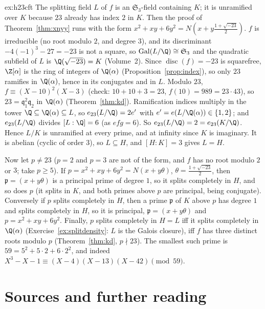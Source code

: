 \begin{solution}{ex:h23cft}
\idea The splitting field $L$ of $f$ is an $\mathfrak S_3$-field containing $K$; it is unramified over $K$ because $23$ already has index $2$ in $K$. Then the proof of
Theorem~\ref{thm:xnyy} runs with the form $x^2+xy+6y^2=N(x+y\frac{1+\sqrt{-23}}2)$.
\writeup $f$ is irreducible (no root modulo $2$, and degree $3$), and its discriminant $-4(-1)^3-27=-23$ is not a square, so $\operatorname{Gal}(L/\Q)\cong\mathfrak S_3$ and the
quadratic subfield of $L$ is $\Q(\sqrt{-23})=K$ (Volume~2). Since $\operatorname{disc}(f)=-23$ is squarefree, $\Z[\alpha]$ is the ring of integers of $\Q(\alpha)$ (Proposition~\ref{prop:index}),
so only $23$ ramifies in $\Q(\alpha)$, hence in its conjugates and in $L$. Modulo $23$, $f\equiv(X-10)^2(X-3)$ (check: $10+10+3=23$, $f(10)=989=23\cdot43$), so
$23=\mathfrak q_1^2\mathfrak q_2$ in $\Q(\alpha)$ (Theorem~\ref{thm:kd}). Ramification indices multiply in the tower $\Q\subseteq\Q(\alpha)\subseteq L$, so
$e_{23}(L/\Q)=2e'$ with $e'=e(L/\Q(\alpha))\in\{1,2\}$; and $e_{23}(L/\Q)$ divides $[L:\Q]=6$ (as $efg=6$). So $e_{23}(L/\Q)=2=e_{23}(K/\Q)$.
Hence $L/K$ is unramified at every prime, and at infinity since $K$ is imaginary. It is abelian (cyclic of order $3$), so $L\subseteq H$, and $[H:K]=3$ gives $L=H$.

Now let $p\ne23$ ($p=2$ and $p=3$ are not of the form, and $f$ has no root modulo $2$ or $3$; take $p\ge5$). If $p=x^2+xy+6y^2=N(x+y\theta)$, $\theta=\frac{1+\sqrt{-23}}2$,
then $\mathfrak p=(x+y\theta)$ is a principal prime of degree $1$, so it splits completely in $H$, and so does $p$ (it splits in $K$, and both primes above $p$ are principal,
being conjugate). Conversely if $p$ splits completely in $H$, then a prime $\mathfrak p$ of $K$ above $p$ has degree $1$ and splits completely in $H$, so it is principal,
$\mathfrak p=(x+y\theta)$ and $p=x^2+xy+6y^2$. Finally, $p$ splits completely in $H=L$ iff it splits completely in $\Q(\alpha)$ (Exercise~\ref{ex:splitdensity}: $L$ is the
Galois closure), iff $f$ has three distinct roots modulo $p$ (Theorem~\ref{thm:kd}, $p\nmid23$). The smallest such prime is $59=5^2+5\cdot2+6\cdot2^2$, and indeed
$X^3-X-1\equiv(X-4)(X-13)(X-42)\pmod{59}$.
\end{solution}

\section*{Sources and further reading}

